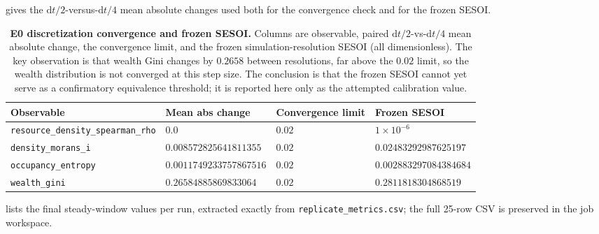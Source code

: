 \documentclass[11pt,a4paper]{article}
\newcommand{\code}[1]{\texttt{#1}}
\begin{document}
 gives the $\mathrm{d}t/2$-versus-$\mathrm{d}t/4$ mean absolute
changes used both for the convergence check and for the frozen SESOI.

\begin{table}[htbp]
\centering
\small
\begin{tabular}{@{}llll@{}}
\toprule
\textbf{Observable} & \textbf{Mean abs change} & \textbf{Convergence limit} & \textbf{Frozen SESOI} \\
\midrule
\code{resource\_density\_spearman\_rho} & $0.0$ & $0.02$ & $1\times10^{-6}$ \\
\code{density\_morans\_i} & $0.008572825641811355$ & $0.02$ & $0.02483292987625197$ \\
\code{occupancy\_entropy} & $0.0011749233757867516$ & $0.02$ & $0.002883297084384684$ \\
\code{wealth\_gini} & $0.26584885869833064$ & $0.02$ & $0.2811818304868519$ \\
\bottomrule
\end{tabular}
\caption{\textbf{E0 discretization convergence and frozen SESOI.} Columns are
observable, paired $\mathrm{d}t/2$-vs-$\mathrm{d}t/4$ mean absolute change,
the convergence limit, and the frozen simulation-resolution SESOI (all
dimensionless). The key observation is that wealth Gini changes by
$0.2658$ between resolutions, far above the $0.02$ limit, so the wealth
distribution is not converged at this step size. The conclusion is that the
frozen SESOI cannot yet serve as a confirmatory equivalence threshold; it is
reported here only as the attempted calibration value.}
\label{tab:e0-dt}
\end{table}

 lists the final steady-window values per run, extracted
exactly from \code{replicate\_metrics.csv}; the full 25-row CSV is preserved in
the job workspace.
\end{document}

